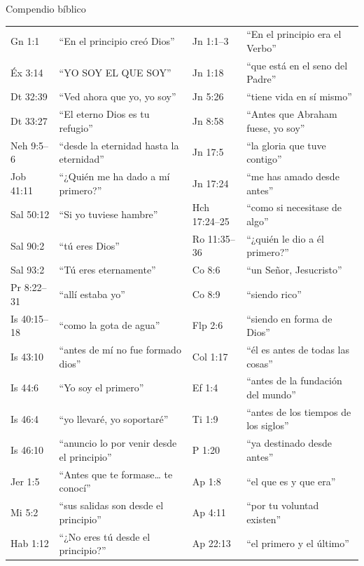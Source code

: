 \begin{frame}{Compendio bíblico}
\fontsize{6.2}{7.2}\selectfont\renewcommand{\arraystretch}{1.02}
\begin{tabular}{@{}>{\RaggedRight\arraybackslash}p{1.5cm}>{\RaggedRight\arraybackslash}p{4.1cm}|>{\RaggedRight\arraybackslash}p{1.5cm}>{\RaggedRight\arraybackslash}p{4.1cm}@{}}
\toprule
Gn 1:1 & ``En el principio creó Dios'' & Jn 1:1--3 & ``En el principio era el Verbo'' \\
Éx 3:14 & ``YO SOY EL QUE SOY'' & Jn 1:18 & ``que está en el seno del Padre'' \\
Dt 32:39 & ``Ved ahora que yo, yo soy'' & Jn 5:26 & ``tiene vida en sí mismo'' \\
Dt 33:27 & ``El eterno Dios es tu refugio'' & Jn 8:58 & ``Antes que Abraham fuese, yo soy'' \\
Neh 9:5--6 & ``desde la eternidad hasta la eternidad'' & Jn 17:5 & ``la gloria que tuve contigo'' \\
Job 41:11 & ``¿Quién me ha dado a mí primero?'' & Jn 17:24 & ``me has amado desde antes'' \\
Sal 50:12 & ``Si yo tuviese hambre'' & Hch 17:24--25 & ``como si necesitase de algo'' \\
Sal 90:2 & ``tú eres Dios'' & Ro 11:35--36 & ``¿quién le dio a él primero?'' \\
Sal 93:2 & ``Tú eres eternamente'' & 1 Co 8:6 & ``un Señor, Jesucristo'' \\
Pr 8:22--31 & ``allí estaba yo'' & 2 Co 8:9 & ``siendo rico'' \\
Is 40:15--18 & ``como la gota de agua'' & Flp 2:6 & ``siendo en forma de Dios'' \\
Is 43:10 & ``antes de mí no fue formado dios'' & Col 1:17 & ``él es antes de todas las cosas'' \\
Is 44:6 & ``Yo soy el primero'' & Ef 1:4 & ``antes de la fundación del mundo'' \\
Is 46:4 & ``yo llevaré, yo soportaré'' & 2 Ti 1:9 & ``antes de los tiempos de los siglos'' \\
Is 46:10 & ``anuncio lo por venir desde el principio'' & 1 P 1:20 & ``ya destinado desde antes'' \\
Jer 1:5 & ``Antes que te formase\ldots{} te conocí'' & Ap 1:8 & ``el que es y que era'' \\
Mi 5:2 & ``sus salidas son desde el principio'' & Ap 4:11 & ``por tu voluntad existen'' \\
Hab 1:12 & ``¿No eres tú desde el principio?'' & Ap 22:13 & ``el primero y el último'' \\
\bottomrule
\end{tabular}
\end{frame}

